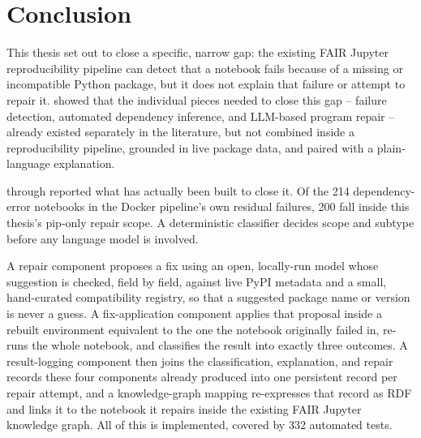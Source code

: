 \chapter{Conclusion}
\label{chap:conclusion}

This thesis set out to close a specific, narrow gap: the existing FAIR
Jupyter reproducibility pipeline can detect that a notebook fails because of
a missing or incompatible Python package, but it does not explain that
failure or attempt to repair it.  showed that the
individual pieces needed to close this gap -- failure detection, automated
dependency inference, and LLM-based program repair -- already existed
separately in the literature, but not combined inside a reproducibility
pipeline, grounded in live package data, and paired with a plain-language
explanation.

 through  reported what has
actually been built to close it. Of the 214 dependency-error notebooks in
the Docker pipeline's own residual failures, 200 fall inside this thesis's
pip-only repair scope. A deterministic classifier decides scope and subtype
before any language model is involved.


A repair component proposes a fix using an open, locally-run model whose
suggestion is checked, field by field, against live PyPI metadata and a
small, hand-curated compatibility registry, so that a suggested package name
or version is never a guess. A fix-application component applies that
proposal inside a rebuilt environment equivalent to the one the notebook
originally failed in, re-runs the whole notebook, and classifies the result
into exactly three outcomes. A result-logging component then joins the
classification, explanation, and repair records these four components
already produced into one persistent record per repair attempt, and a
knowledge-graph mapping re-expresses that record as RDF and links it to the
notebook it repairs inside the existing FAIR Jupyter knowledge graph. All of
this is implemented, covered by 332 automated tests.

